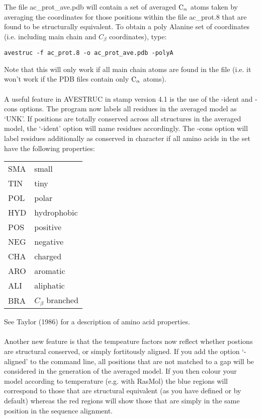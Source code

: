 The file ac\_prot\_ave.pdb will contain a set of averaged ${\rm C}_{\alpha}$ atoms taken 
by averaging the coordinates for those positions within the file 
ac\_prot.8 that are found to be structurally equivalent.  To obtain a poly 
Alanine set of coordinates (i.e. including main chain and $C_{\beta}$ 
coordinates), type:\\

\begin{scriptsize}\begin{verbatim}
avestruc -f ac_prot.8 -o ac_prot_ave.pdb -polyA
\end{verbatim} \end{scriptsize}

Note that this will only work if all main chain atoms are found in the file
(i.e. it won't work if the PDB files contain only ${\rm C}_{\alpha}$ atoms).\\
\\
A useful feature in AVESTRUC in stamp version 4.1 is the use of the -ident
and -cons options.  The program now labels all residues in the averaged model 
as `UNK'.  If positions are totally conserved across all structures in the
averaged model, the `-ident' option will name residues accordingly.  The -cons
option will label residues additionally as conserved in character if all
amino acids in the set have the following properties:\\

\begin{tabular}{ll}
SMA & small \\
TIN & tiny \\
POL & polar \\
HYD & hydrophobic \\
POS & positive \\
NEG & negative \\
CHA & charged \\
ARO & aromatic \\
ALI & aliphatic \\
BRA & $C_{\beta}$ branched \\
\end{tabular}

See Taylor (1986) for a description of amino acid properties.\\ 
\nocite{taylor86a}
\\
Another new feature is that the tempeature factors now reflect whether
postions are structural conserved, or simply fortitously aligned.  If you
add the option `-aligned' to the command line, all positions that are
not matched to a gap will be considered in the generation of the
averaged model.  If you then colour your model according to temperature
(e.g. with RasMol) the blue regions will correspond to those that
are structural equivalent (as you have defined or by default) whereas
the red regions will show those that are simply in the same position in
the sequence alignment.


